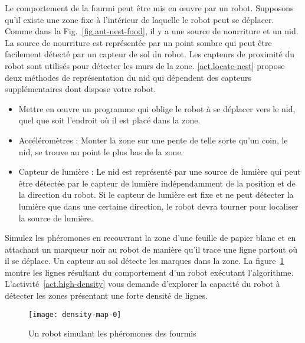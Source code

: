 Le comportement de la fourmi peut être mis en œuvre par un robot.\label{s.ant-like-algo} Supposons qu'il existe une zone fixe à l'intérieur de laquelle le robot peut se déplacer. Comme dans la Fig.~\ref{fig.ant-nest-food}, il y a une source de nourriture et un nid. La source de nourriture est représentée par un point sombre qui peut être facilement détecté par un capteur de sol du robot. Les capteurs de proximité du robot sont utilisés pour détecter les murs de la zone. \ref{act.locate-nest} propose deux méthodes de représentation du nid qui dépendent des capteurs supplémentaires dont dispose votre robot.

\begin{framed}
\begin{itemize}
\item Mettre en œuvre un programme qui oblige le robot à se déplacer vers le nid, quel que soit l'endroit où il est placé dans la zone.
\item Accéléromètres : Monter la zone sur une pente de telle sorte qu'un coin, le nid, se trouve au point le plus bas de la zone. 
\item Capteur de lumière : Le nid est représenté par une source de lumière qui peut être détectée par le capteur de lumière indépendamment de la position et de la direction du robot. Si le capteur de lumière est fixe et ne peut détecter la lumière que dans une certaine direction, le robot devra tourner pour localiser la source de lumière.
\end{itemize}
\end{framed}

Simulez les phéromones en recouvrant la zone d'une feuille de papier blanc et en attachant un marqueur noir au robot de manière qu'il trace une ligne partout où il se déplace. Un capteur au sol détecte les marques dans la zone. La figure~\ref{fig.ant-result} montre les lignes résultant du comportement d'un robot exécutant l'algorithme. L'activité~\ref{act.high-density} vous demande d'explorer la capacité du robot à détecter les zones présentant une forte densité de lignes.

\begin{figure}
\begin{center}
\texttt{[image: density-map-0]}
\end{center}
\caption{Un robot simulant les phéromones des fourmis}\label{fig.ant-result}
\end{figure}

